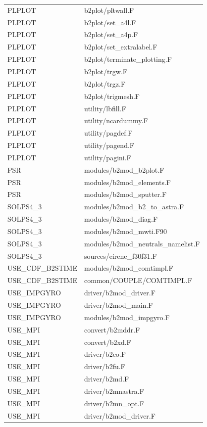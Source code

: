 \documentclass[a4paper,10pt]{report}
\begin{document}
\begin{center}
\begin{longtable}{|l|l|}
PLPLOT & b2plot/pltwall.F \\
PLPLOT & b2plot/set\_a4l.F \\
PLPLOT & b2plot/set\_a4p.F \\
PLPLOT & b2plot/set\_extralabel.F \\
PLPLOT & b2plot/terminate\_plotting.F \\
PLPLOT & b2plot/trgw.F \\
PLPLOT & b2plot/trgz.F \\
PLPLOT & b2plot/trigmesh.F \\
PLPLOT & utility/lbfill.F \\
PLPLOT & utility/ncardummy.F \\
PLPLOT & utility/pagdef.F \\
PLPLOT & utility/pagend.F \\
PLPLOT & utility/pagini.F \\
PSR & modules/b2mod\_b2plot.F \\
PSR & modules/b2mod\_elements.F \\
PSR & modules/b2mod\_sputter.F \\
SOLPS4\_3 & modules/b2mod\_b2\_to\_astra.F \\
SOLPS4\_3 & modules/b2mod\_diag.F \\
SOLPS4\_3 & modules/b2mod\_mwti.F90 \\
SOLPS4\_3 & modules/b2mod\_neutrals\_namelist.F \\
SOLPS4\_3 & sources/eirene\_f30f31.F \\
USE\_CDF\_B2STIME & modules/b2mod\_comtimpl.F \\
USE\_CDF\_B2STIME & common/COUPLE/COMTIMPL.F \\
USE\_IMPGYRO & driver/b2mod\_driver.F \\
USE\_IMPGYRO & driver/b2mod\_main.F \\
USE\_IMPGYRO & modules/b2mod\_impgyro.F \\
USE\_MPI & convert/b2mddr.F \\
USE\_MPI & convert/b2xd.F \\
USE\_MPI & driver/b2co.F \\
USE\_MPI & driver/b2fu.F \\
USE\_MPI & driver/b2md.F \\
USE\_MPI & driver/b2mnastra.F \\
USE\_MPI & driver/b2mn\_opt.F \\
USE\_MPI & driver/b2mod\_driver.F \\

\end{longtable}
\end{center}
\end{document}
